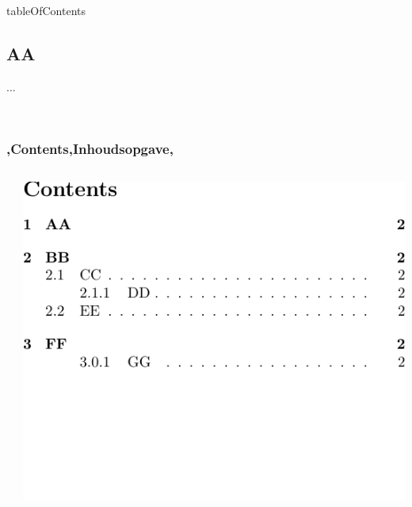 
\begin{saveblock}{tableOfContents}
    \begin{highlightblock}[linewidth=0.5\textwidth,gobble=8]
        
            \maketitle
            \tableofcontents
            \newpage
            
            \section{AA}
            ...
        
            ~~
            ~~
            ~~
            ~~
            ~~
            ~~
            ~~
    \end{highlightblock}
\end{saveblock}

\begin{frame}
    \frametitle{\lang,Contents,Inhoudsopgave,}
    
    \begin{columns}
        \begin{column}{0.5\textwidth}
        \end{column}
        \begin{column}{0.5\textwidth}
            \includegraphics[width=\linewidth,height=0.8\textheight,keepaspectratio,page=1]{assets/tableofcontentswholepage.pdf}
        \end{column}
    \end{columns}
\end{frame}

